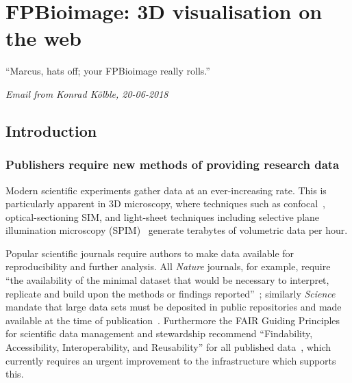 \chapter{FPBioimage: 3D visualisation on the web} \label{chap:FPB}



\ifpdf
    \graphicspath{{Chapter3/Figs/Raster/}{Chapter3/Figs/PDF/}{Chapter3/Figs/}}
\else
    \graphicspath{{Chapter3/Figs/Vector/}{Chapter3/Figs/}}
\fi

``Marcus, hats off; your FPBioimage really rolls.''

\textit{Email from Konrad K\"olble, 20-06-2018}

\section{Introduction}
\subsection{Publishers require new methods of providing research data} \label{sec:introvisual}
Modern scientific experiments gather data at an ever-increasing rate. 
This is particularly apparent in 3D microscopy, where techniques such as confocal~\cite{marvin1961microscopy}, optical-sectioning SIM, and light-sheet techniques including selective plane illumination microscopy (SPIM)~\cite{huisken2004optical} generate terabytes of volumetric data per hour. 

Popular scientific journals require authors to make data available for reproducibility and further analysis. 
All \textit{Nature} journals, for example, require ``the availability of the minimal dataset that would be necessary to interpret, replicate and build upon the methods or findings reported''~\cite{naturedata}; similarly \textit{Science} mandate that large data sets must be deposited in public repositories and made available at the time of publication~\cite{sciencedata}.
Furthermore the FAIR Guiding Principles for scientific data management and stewardship recommend ``Findability, Accessibility, Interoperability, and Reusability'' for all published data~\cite{wilkinson2016fair}, which currently requires an urgent improvement to the infrastructure which supports this. 

